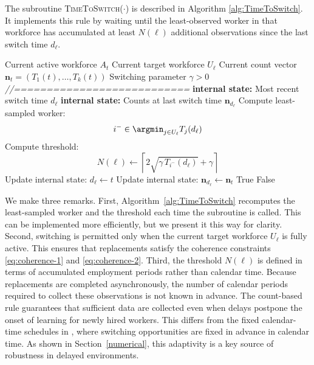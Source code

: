 \documentclass[opre,blindrev]{informs3}
\newcommand{\TimeToSwitch}{\textsc{TimeToSwitch}}
\begin{document}
The subroutine \TimeToSwitch(\(\cdot\)) is described in Algorithm \ref{alg:TimeToSwitch}. It implements this rule by waiting until the least-observed worker in that workforce has accumulated at least \(N(\ell)\) additional observations since the last switch time \(d_\ell\).

\begin{algorithm}
    \caption{TimeToSwitch}
    \label{alg:TimeToSwitch}
    \begin{algorithmic}[1]
        \Require Current active workforce \(A_t\)
        \Require Current target workforce \(U_{\ell}\)
        \Require Current count vector \(\mathbf{n}_t=(T_1(t),\dots,T_k(t))\)
        \Require Switching parameter \(\gamma>0\)
        \Statex \textit{//===========================}
        \State \textbf{internal state:} Most recent switch time \(d_\ell\)
        \State \textbf{internal state:} Counts at last switch time \(\mathbf{n}_{d_{\ell}}\)
        \State Compute least-sampled worker:
        \[
            i^- \in \argmin_{j \in U_\ell} T_j(d_\ell)
        \]
        \State Compute threshold:
        \[
            N(\ell)\gets \left\lceil 2\sqrt{\gamma\, T_{i^-}(d_\ell)} + \gamma \right\rceil
        \]
            \State Update internal state: \(d_{\ell}\gets t\)
            \State Update internal state: \(\mathbf{n}_{d_{\ell}}\gets \mathbf{n}_t\)
            \State \Return True 
        \Else
            \State \Return False 
        \EndIf
    \end{algorithmic}
\end{algorithm}

We make three remarks. First, Algorithm~\ref{alg:TimeToSwitch} recomputes the least-sampled worker and the threshold each time the subroutine is called. This can be implemented more efficiently, but we present it this way for clarity. Second, switching is permitted only when the current target workforce \(U_\ell\) is fully active. This ensures that replacements satisfy the coherence constraints \eqref{eq:coherence-1} and \eqref{eq:coherence-2}. Third, the threshold \(N(\ell)\) is defined in terms of accumulated employment periods rather than calendar time. Because replacements are completed asynchronously, the number of calendar periods required to collect these observations is not known in advance. The count-based rule guarantees that sufficient data are collected even when delays postpone the onset of learning for newly hired workers. This differs from the fixed calendar-time schedules in \cite{agrawal1990switching, gao2019batched, perchet2016batched}, where switching opportunities are fixed in advance in calendar time. As shown in Section~\ref{numerical}, this adaptivity is a key source of robustness in delayed environments.
\end{document}
